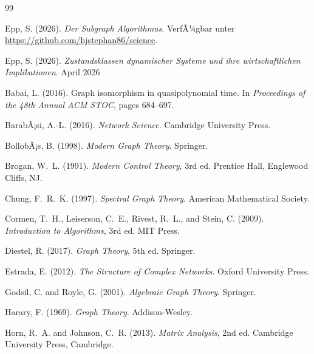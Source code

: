 ﻿\documentclass[12pt, a4paper]{article}
\theoremstyle{definition}
\theoremstyle{remark}
\begin{document}

\begin{thebibliography}{99}
	
	Epp, S. (2026).
	\newblock \textit{Der Subgraph Algorithmus}. VerfÃ¼gbar unter
	\url{https://github.com/hjstephan86/science}.
	
	Epp, S. (2026).
	\newblock \textit{Zustandsklassen dynamischer Systeme und ihre wirtschaftlichen
		Implikationen}. April 2026
	
	Babai, L. (2016).
	\newblock Graph isomorphism in quasipolynomial time.
	\newblock In \textit{Proceedings of the 48th Annual ACM STOC}, pages 684--697.
	
	BarabÃ¡si, A.-L. (2016).
	\newblock \textit{Network Science}.
	\newblock Cambridge University Press.
	
	BollobÃ¡s, B. (1998).
	\newblock \textit{Modern Graph Theory}.
	\newblock Springer.
	
	Brogan, W.~L. (1991).
	\newblock \textit{Modern Control Theory}, 3rd ed.
	\newblock Prentice Hall, Englewood Cliffs, NJ.
	
	Chung, F.~R.~K. (1997).
	\newblock \textit{Spectral Graph Theory}.
	\newblock American Mathematical Society.
	
	Cormen, T.~H., Leiserson, C.~E., Rivest, R.~L., and Stein, C. (2009).
	\newblock \textit{Introduction to Algorithms}, 3rd ed.
	\newblock MIT Press.
	
	Diestel, R. (2017).
	\newblock \textit{Graph Theory}, 5th ed.
	\newblock Springer.
	
	Estrada, E. (2012).
	\newblock \textit{The Structure of Complex Networks}.
	\newblock Oxford University Press.
	
	Godsil, C. and Royle, G. (2001).
	\newblock \textit{Algebraic Graph Theory}.
	\newblock Springer.
	
	Harary, F. (1969).
	\newblock \textit{Graph Theory}.
	\newblock Addison-Wesley.
	
	Horn, R.~A. and Johnson, C.~R. (2013).
	\newblock \textit{Matrix Analysis}, 2nd ed.
	\newblock Cambridge University Press, Cambridge.
	

\end{thebibliography}
\end{document}
